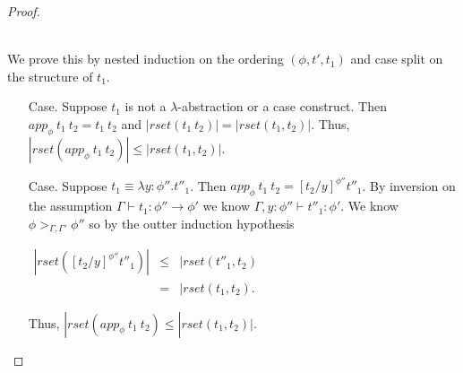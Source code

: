 \begin{proof}
\begin{itemize}
  \ \\
  We prove this by nested induction on the ordering $(\phi, t', t_1)$ and case split on the structure of $t_1$. 
  
  \begin{itemize}
  \item[Case.] Suppose $t_1$ is not a $\lambda$-abstraction or a case construct.  Then
    $app_\phi\ t_1\ t_2 = t_1\ t_2$ and $|rset(t_1\ t_2)| = |rset(t_1,t_2)|$.  Thus,
    $|rset(app_\phi\ t_1\ t_2)| \leq |rset(t_1,t_2)|$.  
    
  \item[Case.] Suppose $t_1 \equiv \lambda y:\phi''.t''_1$.  Then $app_\phi\ t_1\ t_2 = [t_2/y]^{\phi''} t''_1$.
    By inversion on the assumption $\Gamma \vdash t_1:\phi'' \to \phi'$ we know $\Gamma,y:\phi'' \vdash t''_1:\phi'$.  
    We know $\phi >_{\Gamma,\Gamma'} \phi''$ so by the outter induction hypothesis 
    \begin{center}
      \begin{math}
        \begin{array}{lll}
          |rset([t_2/y]^{\phi''} t''_1)| & \leq & |rset(t''_1,t_2)\\
          & =    & |rset(t_1,t_2).
        \end{array}
      \end{math}
    \end{center}
    Thus, $|rset(app_\phi\ t_1\ t_2) \leq |rset(t_1,t_2)|$.
    

\end{itemize}
\end{itemize}
\end{proof}

